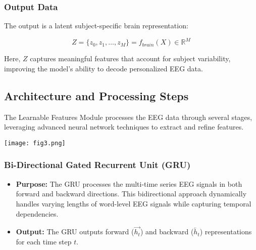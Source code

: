 \documentclass[journal]{IEEEtran}
\begin{document}
\subsubsection{Output Data}
The output is a latent subject-specific brain representation:

\begin{equation}
	Z = \{z_0, z_1, \dots, z_M\} = f_{brain}(X) \in \mathbb{R}^M
\end{equation}

Here, \( Z \) captures meaningful features that account for subject variability, improving the model's ability to decode personalized EEG data.

\subsection{Architecture and Processing Steps}

The Learnable Features Module processes the EEG data through several stages, leveraging advanced neural network techniques to extract and refine features.

\begin{figure*}[t]
	\centering
	\texttt{[image: fig3.png]} %
	\vspace{-10pt} %
	\caption\normalsize{}
	\label{fig:workflow_2}
\end{figure*}

\subsubsection{Bi-Directional Gated Recurrent Unit (GRU)}
\begin{itemize}
	\item \textbf{Purpose:} The GRU processes the multi-time series EEG signals in both forward and backward directions. This bidirectional approach dynamically handles varying lengths of word-level EEG signals while capturing temporal dependencies.
	\item \textbf{Output:} The GRU outputs forward (\( \overrightarrow{h_t} \)) and backward (\( \overleftarrow{h_t} \)) representations for each time step \( t \).
\end{itemize}
\end{document}
